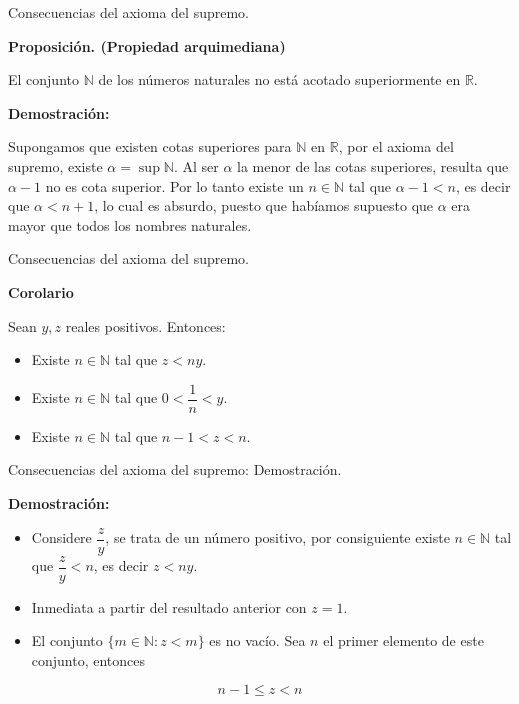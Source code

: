\documentclass[ignorenonframetext,]{beamer}
\providecommand{\tightlist}{%
  \setlength{\itemsep}{0pt}\setlength{\parskip}{0pt}}
\begin{document}
\begin{frame}{Consecuencias del axioma del supremo.}
\protect\hypertarget{consecuencias-del-axioma-del-supremo.}{}

 \textbf{Proposición. (Propiedad arquimediana)}

El conjunto \(\mathbb{N}\) de los números naturales no está acotado
superiormente en \(\mathbb{R}\).

\textbf{Demostración:}

Supongamos que existen cotas superiores para \(\mathbb{N}\) en
\(\mathbb{R}\), por el axioma del supremo, existe
\(\alpha = \sup \mathbb{N}\). Al ser \(\alpha\) la menor de las cotas
superiores, resulta que \(\alpha -1\) no es cota superior. Por lo tanto
existe un \(n \in \mathbb{N}\) tal que \(\alpha -1 <n\), es decir que
\(\alpha < n+1\), lo cual es absurdo, puesto que habíamos supuesto que
\(\alpha\) era mayor que todos los nombres naturales.

\end{frame}

\begin{frame}{Consecuencias del axioma del supremo.}
\protect\hypertarget{consecuencias-del-axioma-del-supremo.-1}{}

\textbf{Corolario}

Sean \(y,z\) reales positivos. Entonces:

\begin{itemize}
\tightlist
\item
  Existe \(n \in \mathbb{N}\) tal que \(z<ny\).
\item
  Existe \(n \in \mathbb{N}\) tal que \(0 <\dfrac{1}{n}<y\).
\item
  Existe \(n \in \mathbb{N}\) tal que \(n-1 <z < n\).
\end{itemize}

\end{frame}

\begin{frame}{Consecuencias del axioma del supremo: Demostración.}
\protect\hypertarget{consecuencias-del-axioma-del-supremo-demostraciuxf3n.}{}

\textbf{Demostración:}

\begin{itemize}
\item
  Considere \(\dfrac{z}{y}\), se trata de un número positivo, por
  consiguiente existe \(n \in \mathbb{N}\) tal que \(\dfrac{z}{y} <n\),
  es decir \(z < ny\).
\item
  Inmediata a partir del resultado anterior con \(z=1\).
\item
  El conjunto \(\{ m \in \mathbb{N}: z<m \}\) es no vacío. Sea \(n\) el
  primer elemento de este conjunto, entonces
\end{itemize}

\[
n-1 \leq z < n
\]

\end{frame}
\end{document}
